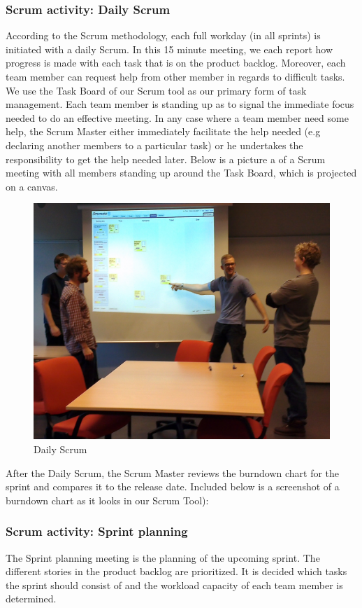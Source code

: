 \subsubsection{Scrum activity: Daily Scrum}
According to the Scrum methodology, each full workday (in all sprints) is initiated with a daily Scrum. In this 15 minute meeting, we each report how progress is made with each task that is on the product backlog. Moreover, each team member can request help from other member in regards to difficult tasks. We use the Task Board of our Scrum tool as our primary form of task management. Each team member is standing up as to signal the immediate focus needed to do an effective meeting. In any case where a team member need some help, the Scrum Master either immediately facilitate the help needed (e.g declaring another members to a particular task) or he undertakes the responsibility to get the help needed later. Below is a picture a of a Scrum meeting with all members standing up around the Task Board, which is projected on a canvas.
\begin{figure}[H]
  \includegraphics[width=\textwidth,natwidth=1696,natheight=1349]{illustrations/Daily.jpg}
  \caption{Daily Scrum}
  \label{dailyscrum}
\end{figure}
After the Daily Scrum, the Scrum Master reviews the burndown chart for the sprint and compares it to the release date. Included below is a screenshot of a burndown chart as it looks in our Scrum Tool):
\subsubsection{Scrum activity: Sprint planning}
The Sprint planning meeting is the planning of the upcoming sprint. The different stories in the product backlog are prioritized. It is decided which tasks the sprint should consist of and the workload capacity of each team member is determined.
